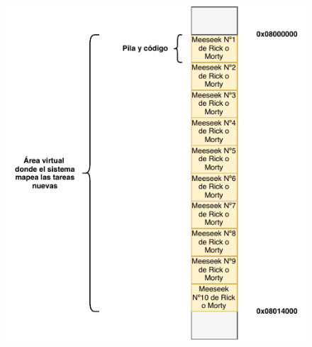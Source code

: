 \documentclass[a4paper]{article}
\begin{document}
\begin{figure}[h]
	\centering
	\includegraphics[scale=1.1]{img/AreaVirtualMeeseeks.pdf}
\end{figure}
\end{document}

